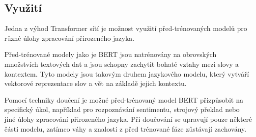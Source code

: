 \subsection{Využití}
Jedna z výhod Transformer sítí je možnost využití před-trénovaných modelů pro různé úlohy zpracování přirozeného jazyka.

Před-trénované modely jako je BERT jsou natrénovány na obrovských množstvích textových dat a jsou schopny zachytit bohaté vztahy mezi slovy a kontextem.
Tyto modely jsou takovým druhem jazykového modelu, který vytváří vektorové reprezentace slov a vět na základě jejich kontextu.

Pomocí techniky doučení je možné před-trénovaný model BERT přizpůsobit na specifický úkol, například pro rozpoznávání sentimentu, strojový překlad nebo jiné úlohy zpracování přirozeného jazyka.
Při doučování se upravují pouze některé části modelu, zatímco váhy a znalosti z před trénované fáze zůstávají zachovány.

\endinput